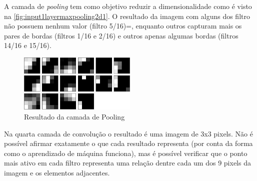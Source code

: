 \documentclass[
	12pt,				%
	oneside,			%
	a4paper,			%
	english,			%
	french,				%
	spanish,			%
	brazil,				%
	]{abntex2}
\begin{document}
\par A camada de \textit{pooling} tem como objetivo reduzir a dimensionalidade como é visto na \autoref{fig:input1layermaxpooling2d1}. O resultado da imagem com alguns dos filtro não possuem nenhum valor (filtro 5/16)=, enquanto outros capturam mais os pares de bordas (filtros 1/16 e 2/16) e outros apenas algumas bordas (filtros 14/16 e 15/16).

\begin{center}
\begin{figure}[H]
	\centering
	\includegraphics[width=0.5\textwidth]{images/fabio/resultados/network_3/input_1_layer_maxpooling2d_1}
	\caption{Resultado da camada de Pooling}
	\label{fig:input1layermaxpooling2d1}
\end{figure}
\end{center}

\par Na quarta camada de convolução o resultado é uma imagem de 3x3 pixels. Não é possível afirmar exatamente o que cada resultado representa (por conta da forma como o aprendizado de máquina funciona), mas é possível verificar que o ponto mais ativo em cada filtro  representa uma relação dentre cada um dos 9 pixels da imagem e os elementos adjacentes.
\end{document}
